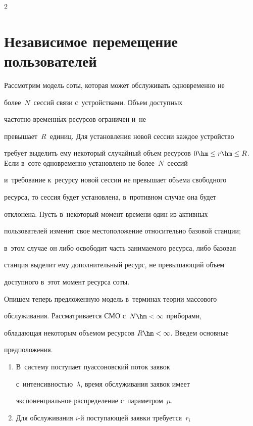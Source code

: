 \begin{multicols}{2}
  

\section{Независимое перемещение пользователей}



  Рассмотрим модель соты, которая может обслуживать одновременно не 

более~$N$~сессий связи с~устройствами. Объем доступных  

час\-тот\-но-вре\-мен\-н$\acute{\mbox{ы}}$х ресурсов ограничен и~не 

превышает~$R$~единиц. Для установления новой сессии каждое устройство 

требует выделить ему некоторый случайный объем ресурсов $0\hm\leq 

r\hm\leq R$. Если в~соте одновременно установлено не более~$N$~сессий 

и~требование к~ресурсу новой сессии не превышает объема свободного 

ресурса, то сессия будет установлена, в~противном случае она будет 

отклонена. Пусть в~некоторый момент времени один из активных 

пользователей изменит свое местоположение относительно базовой станции; 

в~этом случае он либо освободит часть занимаемого ресурса, либо базовая 

станция выделит ему дополнительный ресурс, не превышающий объем 

доступного в~этот момент ресурса соты. 

  

  Опишем теперь предложенную модель в~терминах теории массового 

обслуживания. Рассматривается СМО с~$N\hm<\infty$ приборами, 

обладающая некоторым объемом ресурсов $R\hm<\infty$. Введем основные 

предположения.

  \begin{enumerate}[1.]

\item В~систему поступает пуассоновский поток заявок 

с~интенсивностью~$\lambda$, время обслуживания заявок имеет 

экспоненциальное распределение с~параметром~$\mu$. 

\item Для обслуживания $i$-й поступающей заявки требуется~$r_i$ 


\end{enumerate}
\end{multicols}
